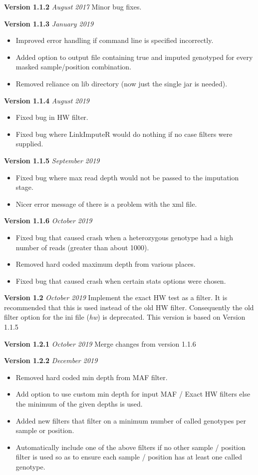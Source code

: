 \documentclass[10pt]{report}
\begin{document}
\textbf{Version 1.1.2} \textit{August 2017} Minor bug fixes.

\textbf{Version 1.1.3} \textit{January 2019}
\begin{itemize}
    \item Improved error handling if command line is specified incorrectly.
    \item Added option to output file containing true and imputed genotyped for every masked sample/position combination.
    \item Removed reliance on lib directory (now just the single jar is needed).
\end{itemize}

\textbf{Version 1.1.4} \textit{August 2019}
\begin{itemize}
    \item Fixed bug in HW filter.
    \item Fixed bug where LinkImputeR would do nothing if no case filters were supplied.
\end{itemize}

\textbf{Version 1.1.5} \textit{September 2019}
\begin{itemize}
    \item Fixed bug where max read depth would not be passed to the imputation stage.
    \item Nicer error message of there is a problem with the xml file.
\end{itemize}

\textbf{Version 1.1.6} \textit{October 2019}
\begin{itemize}
    \item Fixed bug that caused crash when a heterozygous genotype had a high number of reads (greater than about 1000).
    \item Removed hard coded maximum depth from various places.
    \item Fixed bug that caused crash when certain stats options were chosen.
\end{itemize}

\textbf{Version 1.2} \textit{October 2019} Implement the exact HW test as a filter.  It is recommended that this is used instead of the old HW filter.  Consequently the old filter option for the ini file (\emph{hw}) is deprecated.  This version is based on Version 1.1.5

\textbf{Version 1.2.1} \textit{October 2019} Merge changes from version 1.1.6

\textbf{Version 1.2.2} \textit{December 2019}
\begin{itemize}
    \item Removed hard coded min depth from MAF filter.
    \item Add option to use custom min depth for input MAF / Exact HW filters else the minimum of the given depths is used.
    \item Added new filters that filter on a minimum number of called genotypes per sample or position.
    \item Automatically include one of the above filters if no other sample / position filter is used so as to ensure each sample / position has at least one called genotype.
\end{itemize}
\end{document}
